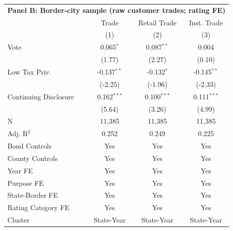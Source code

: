 \begingroup
\centering
\begin{tabular*}{\textwidth}{@{\extracolsep{\fill}}lccc}
\multicolumn{5}{l}{\textbf{Panel B: Border-city sample (raw customer trades; rating FE)}}\\

\addlinespace
   \toprule
                         & Trade         & Retail Trade  & Inst. Trade\\  
                         & (1)           & (2)           & (3)\\  
   \midrule 
   Vote                  & 0.065$^{*}$   & 0.087$^{**}$  & 0.004\\   
                         & (1.77)       & (2.27)       & (0.10)\\   
   Low Tax Priv.         & -0.137$^{**}$ & -0.132$^{*}$  & -0.145$^{**}$\\   
                         & (-2.25)      & (-1.96)      & (-2.33)\\   
   Continuing Disclosure & 0.162$^{***}$ & 0.100$^{***}$ & 0.111$^{***}$\\   
                         & (5.64)       & (3.26)       & (4.99)\\   
   \hline
   N          & 11,385        & 11,385        & 11,385\\  
   Adj. R$^2$        & 0.252         & 0.249         & 0.225\\  
   Bond Controls         & Yes           & Yes           & Yes\\  
   County Controls       & Yes           & Yes           & Yes\\  
   Year FE               & Yes           & Yes           & Yes\\  
   Purpose FE            & Yes           & Yes           & Yes\\  
   State-Border FE       & Yes           & Yes           & Yes\\  
   Rating Category FE    & Yes           & Yes           & Yes\\  
   Cluster              & State-Year & State-Year & State-Year\\  
   \bottomrule
\end{tabular*}
\par\endgroup
